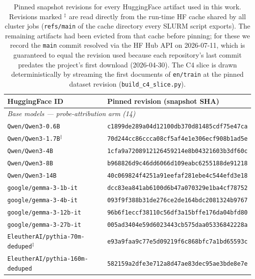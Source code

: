 \begin{table}[h]
\centering
\scriptsize
\caption{Pinned snapshot revisions for every HuggingFace artifact used in
this work. Revisions marked $^{\ddagger}$ are read directly from the
run-time HF cache shared by all cluster jobs (\texttt{refs/main} of the
cache directory every SLURM script exports). The remaining artifacts had
been evicted from that cache before pinning; for these we record the
\texttt{main} commit resolved via the HF Hub API on 2026-07-11, which is
guaranteed to equal the revision used because each repository's last
commit predates the project's first download (2026-04-30). The C4 slice
is drawn deterministically by streaming the first documents of
\texttt{en/train} at the pinned dataset revision
(\texttt{build\_c4\_slice.py}).}
\label{tab:model-revisions}
\begin{tabular}{ll}
\toprule
\textbf{HuggingFace ID} & \textbf{Pinned revision (snapshot SHA)} \\
\midrule
\multicolumn{2}{l}{\textit{Base models --- probe-attribution arm (14)}} \\
\texttt{Qwen/Qwen3-0.6B}                 & \texttt{c1899de289a04d12100db370d81485cdf75e47ca} \\
\texttt{Qwen/Qwen3-1.7B}$^{\ddagger}$    & \texttt{70d244cc86ccca08cf5af4e1e306ecf908b1ad5e} \\
\texttt{Qwen/Qwen3-4B}                   & \texttt{1cfa9a7208912126459214e8b04321603b3df60c} \\
\texttt{Qwen/Qwen3-8B}                   & \texttt{b968826d9c46dd6066d109eabc6255188de91218} \\
\texttt{Qwen/Qwen3-14B}                  & \texttt{40c069824f4251a91eefaf281ebe4c544efd3e18} \\
\texttt{google/gemma-3-1b-it}            & \texttt{dcc83ea841ab6100d6b47a070329e1ba4cf78752} \\
\texttt{google/gemma-3-4b-it}            & \texttt{093f9f388b31de276ce2de164bdc2081324b9767} \\
\texttt{google/gemma-3-12b-it}           & \texttt{96b6f1eccf38110c56df3a15bffe176da04bfd80} \\
\texttt{google/gemma-3-27b-it}           & \texttt{005ad3404e59d6023443cb575daa05336842228a} \\
\texttt{EleutherAI/pythia-70m-deduped}$^{\ddagger}$ & \texttt{e93a9faa9c77e5d09219f6c868bfc7a1bd65593c} \\
\texttt{EleutherAI/pythia-160m-deduped}  & \texttt{582159a2dfe3e712a8d47ae83dec95ae3bde8e7e} \\

\end{tabular}
\end{table}
